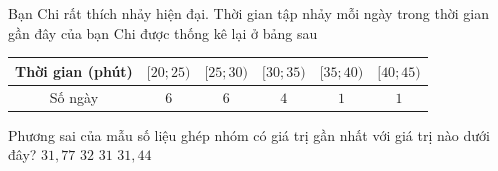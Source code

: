 \begin{ex}%
	Bạn Chi rất thích nhảy hiện đại. Thời gian tập nhảy  mỗi ngày trong thời gian gần đây của bạn Chi được thống kê lại ở bảng sau
	\begin{longtable}{|c|c|c|c|c|c|}
		\hline 
		Thời gian (phút) & $[20;25)$ & $[25;30)$ & $[30;35)$ &  $[35;40)$ & $[40;45)$\\
		 \hline
		Số ngày & $6$ & $6$  & $4$ & $1$ & $1$ \\
		\hline 
	\end{longtable}
	Phương sai của mẫu số liệu ghép nhóm có giá trị gần  nhất với giá trị nào dưới đây?
	\choice 
		{$31{,}77$} 
		 {$32$}
		 {$31$}
		 {\True $31{,}44$}
\end{ex}

